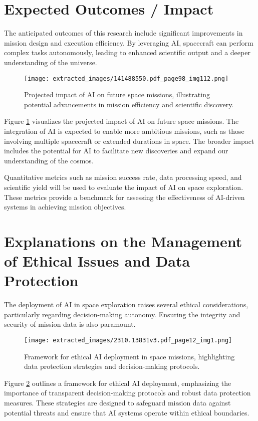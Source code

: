 \documentclass[12pt]{article}
\begin{document}
\section{Expected Outcomes / Impact}
The anticipated outcomes of this research include significant improvements in mission design and execution efficiency. By leveraging AI, spacecraft can perform complex tasks autonomously, leading to enhanced scientific output and a deeper understanding of the universe.

\begin{figure}[htbp]
    \centering
    \texttt{[image: extracted\_images/141488550.pdf\_page98\_img112.png]}
    \caption{Projected impact of AI on future space missions, illustrating potential advancements in mission efficiency and scientific discovery.}
    \label{fig:ai_impact}
\end{figure}

Figure \ref{fig:ai_impact} visualizes the projected impact of AI on future space missions. The integration of AI is expected to enable more ambitious missions, such as those involving multiple spacecraft or extended durations in space. The broader impact includes the potential for AI to facilitate new discoveries and expand our understanding of the cosmos.

Quantitative metrics such as mission success rate, data processing speed, and scientific yield will be used to evaluate the impact of AI on space exploration. These metrics provide a benchmark for assessing the effectiveness of AI-driven systems in achieving mission objectives.

\section{Explanations on the Management of Ethical Issues and Data Protection}
The deployment of AI in space exploration raises several ethical considerations, particularly regarding decision-making autonomy. Ensuring the integrity and security of mission data is also paramount.

\begin{figure}[htbp]
    \centering
    \texttt{[image: extracted\_images/2310.13831v3.pdf\_page12\_img1.png]}
    \caption{Framework for ethical AI deployment in space missions, highlighting data protection strategies and decision-making protocols.}
    \label{fig:ai_ethics}
\end{figure}

Figure \ref{fig:ai_ethics} outlines a framework for ethical AI deployment, emphasizing the importance of transparent decision-making protocols and robust data protection measures. These strategies are designed to safeguard mission data against potential threats and ensure that AI systems operate within ethical boundaries.
\end{document}
